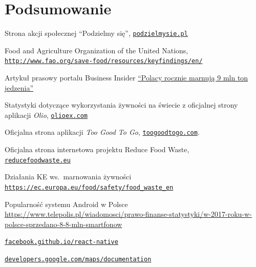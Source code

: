\documentclass[licencjacka]{pracamgr}
\begin{document}
\chapter{Podsumowanie}\label{r:pods}
\begin{thebibliography}{99}

 Strona akcji społecznej ``Podzielmy się'', \href{www.podzielmysie.pl}{\texttt{podzielmysie.pl}}

 Food and Agriculture Organization of the United Nations,\\
    \href{http://www.fao.org/save-food/resources/keyfindings/en/}{\texttt{http://www.fao.org/save-food/resources/keyfindings/en/}}

 Artykuł prasowy portalu Business Insider \href{https://businessinsider.com.pl/lifestyle/jedzenie/marnowanie-zywnosci-ile-ton-jedzenia-wyrzucaja-polacy/5wnn8yt}{``Polacy rocznie marnują 9 mln ton jedzenia''}

 Statystyki dotyczące wykorzystania żywności na świecie z oficjalnej strony aplikacji  \textit{Olio}, \href{https://olioex.com}{\texttt{olioex.com}}

 Oficjalna strona aplikacji \textit{Too Good To Go}, \href{https://toogoodtogo.com}{\texttt{toogoodtogo.com}}.

 Oficjalna strona internetowa projektu Reduce Food Waste,\\
    \href{www.reducefoodwaste.eu}{\texttt{reducefoodwaste.eu}}

 Działania KE ws.\ marnowania żywności\\ \href{https://ec.europa.eu/food/safety/food_waste_en}{\texttt{https://ec.europa.eu/food/safety/food\_waste\_en}}

 Popularność systemu Android w Polsce\\ 
\href{https://www.telepolis.pl/wiadomosci/prawo-finanse-statystyki/w-2017-roku-w-polsce-sprzedano-8-8-mln-smartfonow}{https://www.telepolis.pl/wiadomosci/prawo-finanse-statystyki/w-2017-roku-w-polsce-sprzedano-8-8-mln-smartfonow}

 \href{https://facebook.github.io/react-native/}{\texttt{facebook.github.io/react-native}}

 \href{https://developers.google.com/maps/documentation/}{\texttt{developers.google.com/maps/documentation}}


\end{thebibliography}
\end{document}
